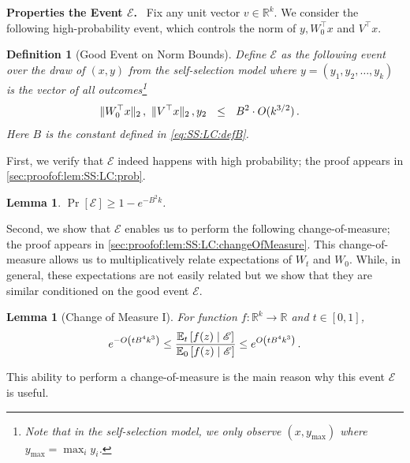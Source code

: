 \documentclass[11pt,letterpaper]{article}
\theoremstyle{plain}
\newtheorem{lemma}[theorem]{Lemma}
\newtheorem{definition}{Definition}
\theoremstyle{definition}
\theoremstyle{remark}
\newcommand{\given}{\;\middle|\;}
\newcommand{\sinparen}[1]{\ensuremath{(#1)}}
\newcommand{\inparen}[1]{\ensuremath{\left(#1\right)}}
\newcommand{\insquare}[1]{\ensuremath{\left[#1\right]}}
\newcommand{\snorm}[1]{\ensuremath{\ensuremath{\| #1 \|}}}
\let\norm\relax
\newcommand{\norm}[1]{\ensuremath{\left\lVert #1 \right\rVert}}
\newcommand{\R}{\mathbb{R}}
\newcommand{\evE}{\ensuremath{\mathscr{E}}}
\newcommand{\E}{\operatornamewithlimits{\mathbb{E}}}
\newcommand{\Ex}{\E}
\renewcommand{\paragraph}[1]{\medskip \noindent\textbf{#1}~}
\newcommand{\ymax}{y_{\max}}
\begin{document}
{{        \paragraph{Properties the Event $\evE$.} 
        \noindent Fix any unit vector $v\in \R^k$.
        We consider the following high-probability event, {which controls the norm {of} ${y}, W_0^\top x$ and $V^\top x$.}
        \begin{definition}
        [Good Event on Norm Bounds]
        \label{def:SS:LC:event}
            Define $\evE$ as the following event {over the draw of $(x,y)$ from the self-selection model where $y=(y_1,y_2,\dots,y_k)$ is the vector of all outcomes}\footnote{{Note that in the self-selection model, we only observe $(x,\ymax)$ where $\ymax=\max_{i}y_i$.}}
            \begin{align*}
                \snorm{W_0^\top x}_2\,,~\snorm{V^\top x}_2\,,\norm{y}_2 &~~\leq~~ B^2\cdot O\sinparen{k^{3/2}}\,.
            \end{align*}
            Here $B$ is the constant defined in \cref{eq:SS:LC:defB}.
        \end{definition}
        First, we verify that $\evE$ indeed happens with high probability; the proof appears in \cref{sec:proofof:lem:SS:LC:prob}.
        \begin{lemma}\label{lem:SS:LC:prob}
            $\Pr[\evE]\geq 1-e^{-B^2 k}$.  
        \end{lemma}
        Second, we show that $\evE$ enables us to perform the following change-of-measure; the proof appears in \cref{sec:proofof:lem:SS:LC:changeOfMeasure}. 
        This change-of-measure allows us to multiplicatively relate expectations of $W_t$ and $W_0$. {While, in general, these} expectations are not easily related but we show that they are {similar} conditioned on the good event $\evE.$
        \begin{lemma}[Change of Measure I]\label{lem:SS:LC:changeOfMeasure}
                For function $f\colon \R^k\to \R$ and $t\in [0,1]$,
                \[
                    e^{-O\inparen{t B^4 k^3}}
                    \leq 
                    \frac{
                        \Ex\nolimits_{t}\insquare{f(z)\given  \evE} 
                    }{
                        \Ex\nolimits_{0}\insquare{f(z)\given  \evE}
                    }\leq 
                    e^{O\inparen{t B^4 k^3}}\,.
                \]
        \end{lemma}
        This ability to perform a change-of-measure is the main reason why this event $\evE$ is useful.
}}
\end{document}
